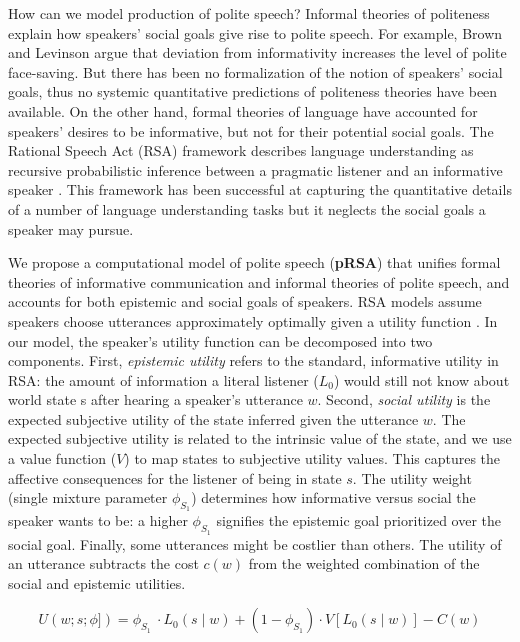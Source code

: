 \documentclass[12pt]{article}
\begin{document}
How can we model production of polite speech? 
Informal theories of politeness explain how speakers' social goals give rise to polite speech. 
For example, Brown and Levinson \cite{brown1987} argue that
deviation from informativity increases the level of polite face-saving.
But there has been no formalization of the notion of speakers' social goals, 
thus no systemic quantitative predictions of politeness theories have been available.
On the other hand, formal theories of language have accounted for speakers' desires to be informative, but not for their potential social goals. 
The Rational Speech Act (RSA) framework describes language understanding 
as recursive probabilistic inference between a pragmatic listener and an informative speaker \cite{goodman2016}. 
This framework has been successful at capturing the quantitative details of a number of language understanding tasks 
but it neglects the social goals a speaker may pursue. 

We propose a computational model of polite speech (\textbf{pRSA}) 
that unifies formal theories of informative communication and informal theories of polite speech, 
and accounts for both epistemic and social goals of speakers. 
RSA models assume speakers choose utterances 
approximately optimally given a utility function \cite{goodman2013}. 
In our model, the speaker's utility function can be decomposed into two components. 
First, \emph{epistemic utility} refers to the standard, informative utility in RSA: 
the amount of information a literal listener (\(L_0\)) would still not know about world state s after hearing a speaker's utterance \(w\).
Second, \emph{social utility} is the expected subjective utility of the state inferred given the utterance \(w\). 
The expected subjective utility is related to the intrinsic value of the state, 
and we use a value function (\(V\)) to map states to subjective utility values. 
This captures the affective consequences for the listener of being in state \(s\). 
The utility weight (single mixture parameter \(\phi_{S_1}\)) determines how informative versus social the speaker wants to be: 
a higher \(\phi_{S_1}\) signifies the epistemic goal prioritized over the social goal. 
Finally, some utterances might be costlier than others. 
The utility of an utterance subtracts the cost \(c(w)\) from the weighted
combination of the social and epistemic utilities.

\[U(w; s; \phi]) = \phi_{S_1}\ \cdot L_0(s \mid w) + 
(1 - \phi_{S_1}) \cdot V[L_0(s \mid w)]  - C(w)\]
\end{document}
